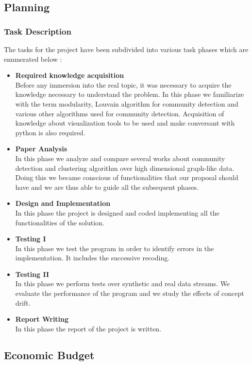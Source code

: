 \subsection{Planning}
\subsubsection{Task Description}
The tasks for the project have been subdivided into various task phases which are enumerated below : 
\begin{itemize}
\item \textbf{Required knowledge acquisition}\\
Before any immersion into the real topic, it was necessary to acquire the knowledge
necessary to understand the problem. In this phase we familiarize with the term
modularity, Louvain algorithm for community detection and various other algorithms
used for community detection.
Acquisition of knowledge about visualization tools to be used and make conversant with python is also
required.
\item \textbf{Paper Analysis}\\ In this phase we analyze and compare several works about
community detection and clustering algorithm over high dimensional graph-like data.
Doing this we became conscious of functionalities that our proposal should have and we
are thus able to guide all the subsequent phases.

\item \textbf{Design and Implementation} \\ In this phase the project is designed and coded implementing all the functionalities of the solution. 
\item \textbf{Testing I}\\
In this phase we test the program in order to identify errors in
the implementation. It includes the successive recoding.
\item \textbf{Testing II}\\
In this phase we perform tests over synthetic and real data
streams. We evaluate the performance of the program and we study
the effects of concept drift.
\item \textbf{Report Writing}\\
In this phase the report of the project is written.
\end{itemize} 
\subsection{Economic Budget}
